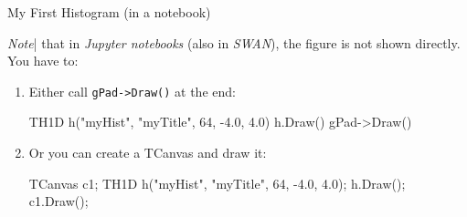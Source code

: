 \documentclass[aspectratio=169]{beamer}
\begin{document}
\begin{frame}[fragile]{My First Histogram (in a notebook)}

    \textit{Note}| that in \textit{Jupyter notebooks} (also in \textit{SWAN}), the figure is not shown directly. You have to:
    \vspace{5mm}

    \begin{enumerate}
        \item Either call \texttt{gPad->Draw()} at the end:

              \begin{cppcell}
TH1D h("myHist", "myTitle", 64, -4.0, 4.0)
h.Draw()
gPad->Draw()
              \end{cppcell}

        \item Or you can create a TCanvas and draw it:

              \begin{cppcell}
TCanvas c1;
TH1D h("myHist", "myTitle", 64, -4.0, 4.0);
h.Draw();
c1.Draw();
              \end{cppcell}

    \end{enumerate}

\end{frame}
\end{document}
